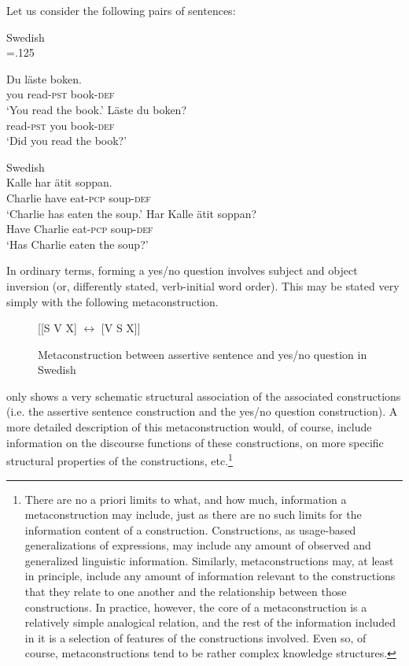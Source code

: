 \documentclass[output=paper, colorlinks,citecolor=brown]{langsci/langscibook}
\begin{document}
Let us consider the following pairs of sentences:\largerpage[1.75]

\ea\label{ex:leino_8a}
{Swedish}\\\multicolsep=.125\baselineskip
\begin{multicols}{2}
\ea
\gll Du  läste        boken.\\
     you read-\textsc{pst}  book-\textsc{def}\\
\glt `You read the book.'
\ex\label{ex:leino_8b}
\gll Läste       du    boken?\\
     read-\textsc{pst}  you  book-\textsc{def} \\
\glt `Did you read the book?'
\z
\end{multicols}
\ex\label{ex:leino_9b}
{Swedish}\\
\ea
\gll Kalle     har    ätit         soppan.\\
     Charlie  have  eat-\textsc{pcp}  soup-\textsc{def}\\
\glt `Charlie has eaten the soup.'
\ex\label{ex:leino_9c}
\gll Har    Kalle     ätit         soppan?\\
     Have  Charlie  eat-\textsc{pcp}  soup-\textsc{def}\\
\glt `Has Charlie eaten the soup?'
\z
\z


In ordinary terms, forming a yes/no question involves subject and object inversion (or, differently stated, verb-initial word order). This may be stated very simply with the following metaconstruction.

\begin{figure}{}
         [[S V X] $\leftrightarrow $ [V S X]]
        \caption{Metaconstruction between assertive sentence and yes/no question in Swedish}
        \label{fig:leino_fig7}
\end{figure}


 only shows a very schematic structural association of the associated constructions (i.e. the assertive sentence construction and the yes/no question construction). A more detailed description of this metaconstruction would, of course, include information on the discourse functions of these constructions, on more specific structural properties of the constructions, etc.\footnote{There are no a priori limits to what, and how much, information a metaconstruction may include, just as there are no such limits for the information content of a construction. Constructions, as usage-based generalizations of expressions, may include any amount of observed and generalized linguistic information. Similarly, metaconstructions may, at least in principle, include any amount of information relevant to the constructions that they relate to one another and the relationship between those constructions. In practice, however, the core of a metaconstruction is a relatively simple analogical relation, and the rest of the information included in it is a selection of features of the constructions involved. Even so, of course, metaconstructions tend to be rather complex knowledge structures.}
\end{document}
